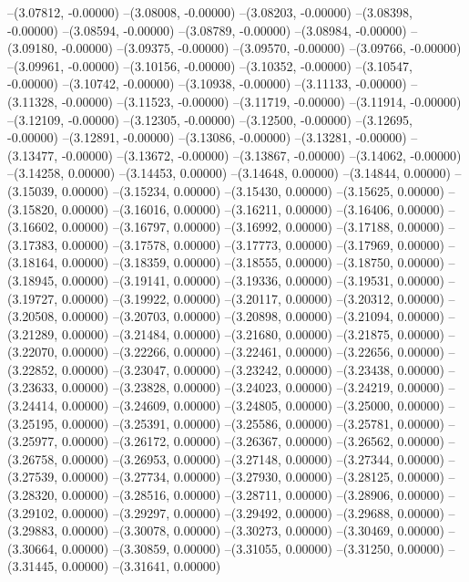 --(3.07812, -0.00000)
--(3.08008, -0.00000)
--(3.08203, -0.00000)
--(3.08398, -0.00000)
--(3.08594, -0.00000)
--(3.08789, -0.00000)
--(3.08984, -0.00000)
--(3.09180, -0.00000)
--(3.09375, -0.00000)
--(3.09570, -0.00000)
--(3.09766, -0.00000)
--(3.09961, -0.00000)
--(3.10156, -0.00000)
--(3.10352, -0.00000)
--(3.10547, -0.00000)
--(3.10742, -0.00000)
--(3.10938, -0.00000)
--(3.11133, -0.00000)
--(3.11328, -0.00000)
--(3.11523, -0.00000)
--(3.11719, -0.00000)
--(3.11914, -0.00000)
--(3.12109, -0.00000)
--(3.12305, -0.00000)
--(3.12500, -0.00000)
--(3.12695, -0.00000)
--(3.12891, -0.00000)
--(3.13086, -0.00000)
--(3.13281, -0.00000)
--(3.13477, -0.00000)
--(3.13672, -0.00000)
--(3.13867, -0.00000)
--(3.14062, -0.00000)
--(3.14258, 0.00000)
--(3.14453, 0.00000)
--(3.14648, 0.00000)
--(3.14844, 0.00000)
--(3.15039, 0.00000)
--(3.15234, 0.00000)
--(3.15430, 0.00000)
--(3.15625, 0.00000)
--(3.15820, 0.00000)
--(3.16016, 0.00000)
--(3.16211, 0.00000)
--(3.16406, 0.00000)
--(3.16602, 0.00000)
--(3.16797, 0.00000)
--(3.16992, 0.00000)
--(3.17188, 0.00000)
--(3.17383, 0.00000)
--(3.17578, 0.00000)
--(3.17773, 0.00000)
--(3.17969, 0.00000)
--(3.18164, 0.00000)
--(3.18359, 0.00000)
--(3.18555, 0.00000)
--(3.18750, 0.00000)
--(3.18945, 0.00000)
--(3.19141, 0.00000)
--(3.19336, 0.00000)
--(3.19531, 0.00000)
--(3.19727, 0.00000)
--(3.19922, 0.00000)
--(3.20117, 0.00000)
--(3.20312, 0.00000)
--(3.20508, 0.00000)
--(3.20703, 0.00000)
--(3.20898, 0.00000)
--(3.21094, 0.00000)
--(3.21289, 0.00000)
--(3.21484, 0.00000)
--(3.21680, 0.00000)
--(3.21875, 0.00000)
--(3.22070, 0.00000)
--(3.22266, 0.00000)
--(3.22461, 0.00000)
--(3.22656, 0.00000)
--(3.22852, 0.00000)
--(3.23047, 0.00000)
--(3.23242, 0.00000)
--(3.23438, 0.00000)
--(3.23633, 0.00000)
--(3.23828, 0.00000)
--(3.24023, 0.00000)
--(3.24219, 0.00000)
--(3.24414, 0.00000)
--(3.24609, 0.00000)
--(3.24805, 0.00000)
--(3.25000, 0.00000)
--(3.25195, 0.00000)
--(3.25391, 0.00000)
--(3.25586, 0.00000)
--(3.25781, 0.00000)
--(3.25977, 0.00000)
--(3.26172, 0.00000)
--(3.26367, 0.00000)
--(3.26562, 0.00000)
--(3.26758, 0.00000)
--(3.26953, 0.00000)
--(3.27148, 0.00000)
--(3.27344, 0.00000)
--(3.27539, 0.00000)
--(3.27734, 0.00000)
--(3.27930, 0.00000)
--(3.28125, 0.00000)
--(3.28320, 0.00000)
--(3.28516, 0.00000)
--(3.28711, 0.00000)
--(3.28906, 0.00000)
--(3.29102, 0.00000)
--(3.29297, 0.00000)
--(3.29492, 0.00000)
--(3.29688, 0.00000)
--(3.29883, 0.00000)
--(3.30078, 0.00000)
--(3.30273, 0.00000)
--(3.30469, 0.00000)
--(3.30664, 0.00000)
--(3.30859, 0.00000)
--(3.31055, 0.00000)
--(3.31250, 0.00000)
--(3.31445, 0.00000)
--(3.31641, 0.00000)
